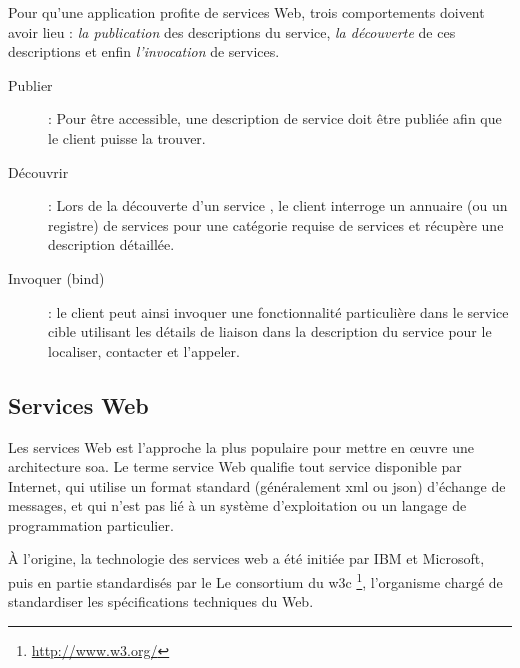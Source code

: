   Pour qu'une application profite de services Web, trois comportements
  doivent avoir lieu : \textit{la publication} des descriptions du
  service, \textit{la découverte} de ces descriptions et enfin
  \textit{l'invocation} de services.

  \renewcommand{\descriptionlabel}[1]{\hspace{1cm}\textbullet~\textsf{#1}}
  \begin{description}
  \item[Publier]: Pour être accessible, une description de service
    doit être publiée afin que le client puisse la trouver.

  \item[Découvrir]: Lors de la découverte d'un service , le client
    interroge un annuaire (ou un registre) de services pour une
    catégorie requise de services et récupère une description
    détaillée.

  \item[Invoquer (bind)]: le client peut ainsi invoquer une
    fonctionnalité particulière dans le service cible utilisant les
    détails de liaison dans la description du service pour le
    localiser, contacter et l'appeler.
  \end{description}


\newpage
\subsection{Services Web}
  Les services Web est l'approche la plus populaire pour mettre en
  œuvre une architecture \acrshort{soa}. Le terme service Web qualifie
  tout service disponible par Internet, qui utilise un format standard
  (généralement \acrshort{xml} ou \acrshort{json}) d'échange de
  messages, et qui n'est pas lié à un système d'exploitation ou un
  langage de programmation particulier.

  À l'origine, la technologie des services web a été initiée par IBM
  \cite{kreger2001web} et Microsoft, puis en partie standardisés par
  le Le consortium du \acrshort{w3c}
  \footnote{\url{http://www.w3.org/}}, l'organisme chargé de
  standardiser les spécifications techniques du Web.

